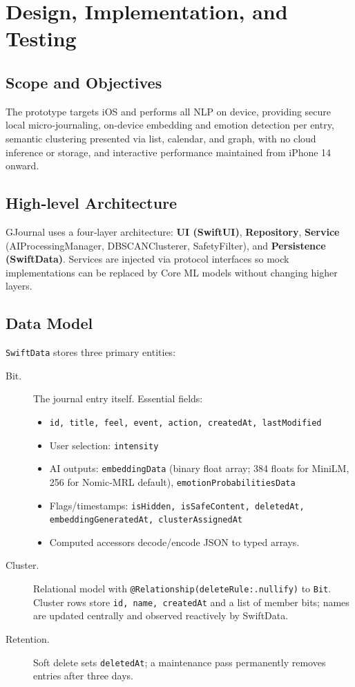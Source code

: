 \chapter{Design, Implementation, and Testing}
\label{ch:implementation}

\section{Scope and Objectives}
The prototype targets iOS and performs all NLP on device, providing secure local micro‑journaling, on‑device embedding and emotion detection per entry, semantic clustering presented via list, calendar, and graph, with no cloud inference or storage, and interactive performance maintained from iPhone 14 onward.

\section{High‑level Architecture}
GJournal uses a four‑layer architecture: \textbf{UI (SwiftUI)}, \textbf{Repository}, \textbf{Service} (AI\allowbreak{}Processing\allowbreak{}Manager, DBSCAN\allowbreak{}Clusterer, Safety\allowbreak{}Filter), and \textbf{Persistence (SwiftData)}. Services are injected via protocol interfaces so mock implementations can be replaced by Core ML models without changing higher layers.

\section{Data Model}
\texttt{SwiftData} stores three primary entities:
\begin{description}
  \item[Bit.] The journal entry itself. Essential fields:
    \begin{itemize}
      \item \texttt{id, title, feel, event, action, createdAt, lastModified}
      \item User selection: \texttt{intensity}
      \item AI outputs: \texttt{embeddingData} (binary float array; 384 floats for MiniLM, 256 for Nomic-MRL default), \texttt{emotionProbabilitiesData}
      \item Flags/timestamps: \texttt{isHidden, isSafeContent, deletedAt,\\ embeddingGeneratedAt, clusterAssignedAt}
      \item Computed accessors decode/encode JSON to typed arrays.
    \end{itemize}
  \item[Cluster.] Relational model with \texttt{@Relationship\allowbreak{}(deleteRule:\allowbreak{}.nullify)} to \texttt{Bit}. Cluster rows store \texttt{id, name, createdAt} and a list of member bits; names are updated centrally and observed reactively by SwiftData.
  \item[Retention.] Soft delete sets \texttt{deletedAt}; a maintenance pass permanently removes entries after three days.
\end{description}

